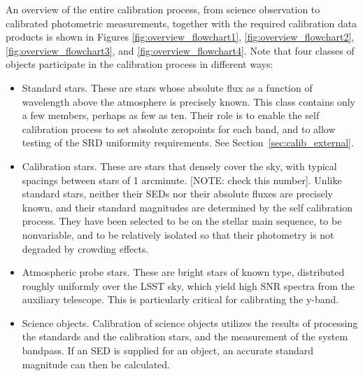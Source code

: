 \documentclass[12pt,preprint]{aastex}
\begin{document}
An overview of the entire calibration process, from science observation
to calibrated photometric measurements, together with the required
calibration data products is shown in
Figures \ref{fig:overview_flowchart1}, \ref{fig:overview_flowchart2}, 
\ref{fig:overview_flowchart3}, and \ref{fig:overview_flowchart4}.  
Note that four classes of objects participate in the calibration process in different ways:
\begin{itemize}
\item Standard stars.  These are stars whose absolute flux as a function of wavelength above the atmosphere is precisely known.  This class contains only a few members, perhaps as few as ten.  Their role is to enable the self calibration process to set absolute zeropoints for each band, and to allow testing of the SRD uniformity requirements.  See Section~\ref{sec:calib_external}.
\item Calibration stars.  These are stars that densely cover the sky, with typical spacings between stars of 1 arcminute. [NOTE: check this number].  Unlike standard stars, neither their SEDs nor their absolute fluxes are precisely known, and their standard magnitudes are determined by the self calibration process.   They have been selected to be on the stellar main sequence, to be nonvariable, and to be relatively isolated so that their photometry is not degraded by crowding effects.
\item Atmospheric probe stars.   These are bright stars of known type, distributed roughly uniformly over the LSST sky, which yield high SNR spectra from the auxiliary telescope.  This is particularly critical for calibrating the y-band.
\item Science objects.  Calibration of science objects utilizes the results of processing the standards and the calibration stars, and the measurement of the system bandpass.   If an SED is supplied for an object, an accurate standard magnitude can then be calculated.
\end{itemize}
\end{document}
